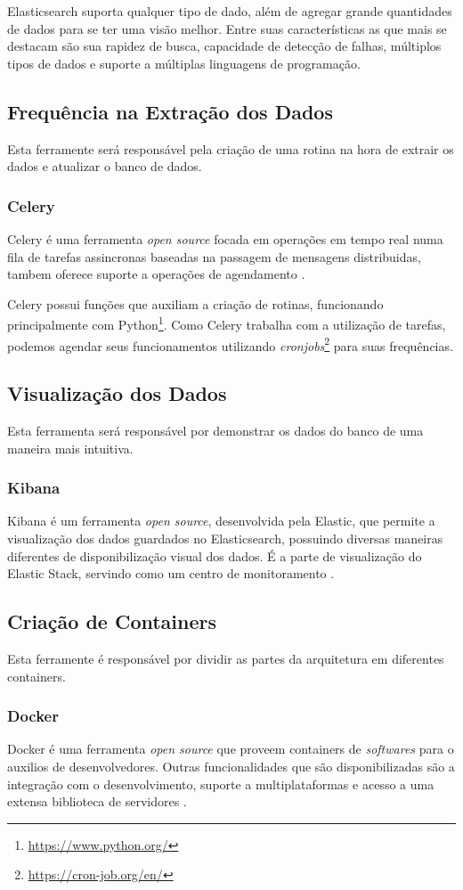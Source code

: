 Elasticsearch suporta qualquer tipo de dado, além de agregar grande quantidades de dados para se ter uma visão melhor. Entre suas características as que mais se destacam são sua rapidez de busca, capacidade de detecção de falhas, múltiplos tipos de dados e suporte a múltiplas linguagens de programação.
\subsection{Frequência na Extração dos Dados}
Esta ferramente será responsável pela criação de uma rotina na hora de extrair os dados e atualizar o banco de dados.
\subsubsection*{Celery}
Celery é uma ferramenta \textit{open source} focada em operações em tempo real numa fila de tarefas assincronas baseadas na passagem de mensagens distribuidas, tambem oferece suporte a operações de agendamento \cite{celery}.

Celery possui funções que auxiliam a criação de rotinas, funcionando principalmente com Python\footnote[3]{\url{https://www.python.org/}}. Como Celery trabalha com a utilização de tarefas, podemos agendar seus funcionamentos utilizando \textit{cronjobs}\footnote[4]{\url{https://cron-job.org/en/}} para suas frequências.
\subsection{Visualização dos Dados}
Esta ferramenta será responsável por demonstrar os dados do banco de uma maneira mais intuitiva.
\subsubsection*{Kibana}
Kibana é um ferramenta \textit{open source}, desenvolvida pela Elastic, que permite a visualização dos dados guardados no Elasticsearch, possuindo diversas maneiras diferentes de disponibilização visual dos dados. É a parte de visualização do Elastic Stack, servindo como um centro de monitoramento \cite{kibana}.

\subsection{Criação de Containers}
Esta ferramente é responsável por dividir as partes da arquitetura em diferentes containers.
\subsubsection*{Docker}
Docker é uma ferramenta \textit{open source} que proveem containers de \textit{softwares} para o auxilios de desenvolvedores. Outras funcionalidades que são disponibilizadas são a integração com o desenvolvimento, suporte a multiplataformas e acesso a uma extensa biblioteca de servidores \cite{docker}.

